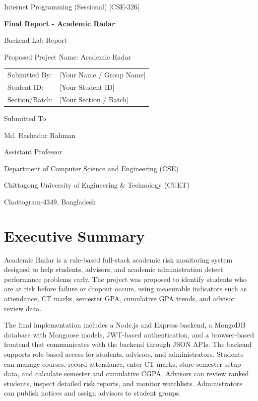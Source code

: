 \documentclass[12pt,a4paper]{article}
\begin{document}
\begin{titlepage}
\centering
{\Large Internet Programming (Sessional) [CSE-326] \par}
\vspace{1.5cm}
{\huge\bfseries Final Report - Academic Radar \par}
\vspace{0.3cm}
{\Large Backend Lab Report \par}
\vspace{1.3cm}
{\large Proposed Project Name: Academic Radar \par}
\vspace{1.2cm}
\begin{tabular}{ll}
Submitted By: & [Your Name / Group Name] \\
Student ID: & [Your Student ID] \\
Section/Batch: & [Your Section / Batch] \\
\end{tabular}

\vfill
{\large Submitted To \par}
\vspace{0.2cm}
{\large Md. Rashadur Rahman \par}
{\large Assistant Professor \par}
{\large Department of Computer Science and Engineering (CSE) \par}
{\large Chittagong University of Engineering \& Technology (CUET) \par}
\vspace{0.8cm}
{\large Chattogram-4349, Bangladesh \par}
\end{titlepage}

\tableofcontents
\newpage

\section{Executive Summary}
Academic Radar is a rule-based full-stack academic risk monitoring system designed to help students, advisors, and academic administration detect performance problems early. The project was proposed to identify students who are at risk before failure or dropout occurs, using measurable indicators such as attendance, CT marks, semester GPA, cumulative GPA trends, and advisor review data.

The final implementation includes a Node.js and Express backend, a MongoDB database with Mongoose models, JWT-based authentication, and a browser-based frontend that communicates with the backend through JSON APIs. The backend supports role-based access for students, advisors, and administrators. Students can manage courses, record attendance, enter CT marks, store semester setup data, and calculate semester and cumulative CGPA. Advisors can review ranked students, inspect detailed risk reports, and monitor watchlists. Administrators can publish notices and assign advisors to student groups.
\end{document}

